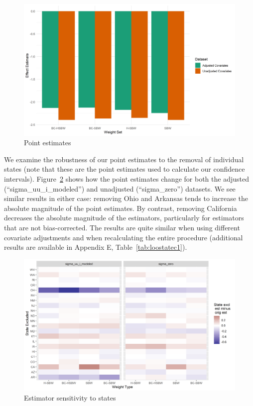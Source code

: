 \documentclass{article}
\begin{document}
\begin{figure}
\begin{center}
    \caption{Point estimates}
    \label{fig:estimators}
    \includegraphics[scale=0.6]{01_Plots/point-estimates-c1.png}
\end{center}
\end{figure}

We examine the robustness of our point estimates to the removal of individual states (note that these are the point estimates used to calculate our confidence intervals). Figure~\ref{fig:loostateplot} shows how the point estimates change for both the adjusted (``sigma\_uu\_i\_modeled'') and unadjusted (``sigma\_zero'') datasets. We see similar results in either case: removing Ohio and Arkansas tends to increase the absolute magnitude of the point estimates. By contrast, removing California decreases the absolute magnitude of the estimators, particularly for estimators that are not bias-corrected. The results are quite similar when using different covariate adjustments and when recalculating the entire procedure (additional results are available in Appendix E, Table~\ref{tab:loostatec1}). 

\begin{figure}
\begin{center}
    \caption{Estimator sensitivity to states}
    \label{fig:loostateplot}
    \includegraphics[scale=0.6]{01_Plots/loostate-sensitivityc1-state-uu-i.png}
\end{center}
\end{figure}
\end{document}
